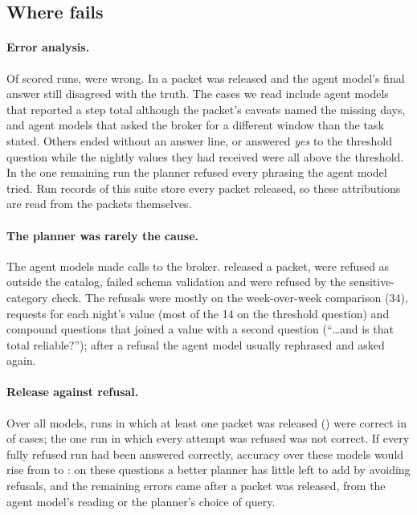 \subsection{Where \sys{} fails}\label{sec:res:failures}

\paragraph{Error analysis.} Of \cRuns{} scored \CC{} runs, \cErr{} were wrong. In \cErrReleased{} a packet was
released and the agent model's final answer still disagreed with the truth. The cases we read include agent models
that reported a step total although the packet's caveats named the missing days, and agent models that asked the
broker for a different window than the task stated. Others ended without an answer line, or answered \emph{yes} to
the threshold question while the nightly values they had received were all above the threshold. In the one remaining
run the planner refused every phrasing the agent model tried.
Run records of this suite store every packet released, so these attributions are read from the packets themselves.

\paragraph{The planner was rarely the cause.} The agent models made \cAsks{} calls to the broker. \cAsksReleased{}
released a packet, \cAsksOutside{} were refused as outside the catalog, \cAsksPlannerFailed{} failed schema validation and \cAsksSensitive{} were refused by the
sensitive-category check. The refusals were mostly on the week-over-week comparison (34), requests for each night's value (most of the 14 on the threshold question) and compound questions that joined a
value with a second question (``\ldots and is that total reliable?''); after a refusal the agent model usually
rephrased and asked again.

\paragraph{Release against refusal.} Over all models, \CC{} runs in which at least one packet was released
(\cReleasedN{}) were correct in \cReleasedAcc{} of cases; the one run in which every attempt was refused was not
correct. If every fully refused run had been answered correctly, \CC{} accuracy over these models
would rise from \cAccNow{} to \cAccPerfectPlanner{}: on these questions a better planner has little left to add
by avoiding refusals, and the remaining errors came after a packet was released, from the agent model's reading or
the planner's choice of query.

